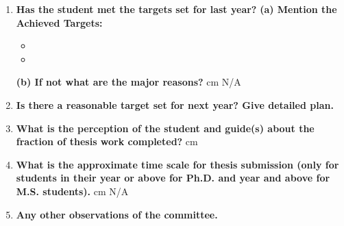\documentclass[12 pt, a4paper]{article}
\begin{document}
\begin{enumerate}
    \item \textbf{Has the student met the targets set for last year?}
    \vskip 0.2cm
	\textbf{(a) Mention the Achieved Targets:}
	
	\begin{itemize}
	    \item 
	    \item 
	\end{itemize}
	\textbf{(b) If not what are the major reasons?}
	\vskip 0.2cm
	 cm N/A
	\vspace{0.2cm}
	\item \textbf{Is there a reasonable target set for next year? Give detailed plan.}
	\begin{figure}[h]
    \centering  
    \end{figure}
	\item \textbf{What is the perception of the student and guide(s) about the fraction of thesis work completed?}
	\vskip 0.2cm
	 cm 
	\item\textbf{What is the approximate time scale for thesis submission (only for students in their
		\bf {} year or above for Ph.D. and  year and above for M.S. students).}
	\vskip 0.2cm
	 cm N/A
	\item\bf{Any other observations of the committee.}
	\vspace*{1.0 cm}


\end{enumerate}
\clearpage





\end{document}
